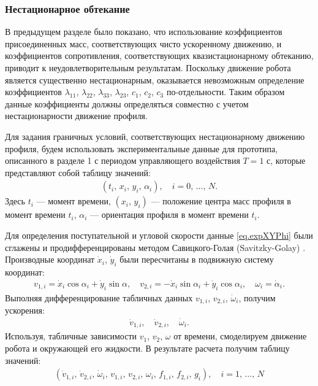 \newpage

\subsubsection*{Нестационарное обтекание}\label{ssec.unsteady}


В предыдущем разделе было показано, что использование коэффициентов присоединенных масс, соответствующих чисто ускоренному движению, и коэффициентов сопротивления, соответствующих квазистационарному обтеканию, приводит к неудовлетворительным результатам. Поскольку движение робота является существенно нестационарным, оказывается невозможным определение коэффициентов $\lambda_{11}$, $\lambda_{22}$, $\lambda_{33}$, $\lambda_{23}$, $c_1$, $c_2$, $c_3$ по-отдельности. Таким образом данные коэффициенты должны определяться совместно с учетом нестационарности движение профиля.

Для задания граничных условий, соответствующих нестационарному движению профиля, будем использовать экспериментальные данные для прототипа, описанного в разделе 1 с периодом управляющего воздействия $T = 1$ с, которые представляют собой таблицу значений:
\begin{gather}
	(t_i,\, x_i,\, y_i,\, \alpha_i),\quad i = 0,\, \ldots,\, N.\label{eq.expXYPhi}
\end{gather}
Здесь $t_i$ --- момент времени, $(x_i,\, y_i)$ --- положение центра масс профиля в момент времени $t_i$, $\alpha_i$ --- ориентация профиля в момент времени $t_i$.

Для определения поступательной и угловой скорости данные \eqref{eq.expXYPhi} были сглажены и продифференцированы методом Савицкого-Голая (Savitzky-Golay) \cite{Gorry_1990, Savitzky_Golay_1964}. Производные координат $\dot{x}_i$, $\dot{y}_i$ были пересчитаны в подвижную систему координат:
\begin{gather}
	v_{1,i} = \dot{x}_i \cos\alpha_i + \dot{y}_i \sin \alpha,\quad v_{2,i} = -\dot{x}_i \sin\alpha_i + \dot{y}_i \cos\alpha_i,\quad \omega_i = \dot{\alpha}_i.
\end{gather}
Выполняя дифференцирование табличных данных $v_{1,i}$, $v_{2,i}$, $\dot{\omega}_i$, получим ускорения:
\begin{gather}
	\dot{v}_{1,i},\quad \dot{v}_{2,i},\quad \dot{\omega}_i.
\end{gather}
Используя, табличные зависимости $v_1$, $v_2$, $\omega$ от времени, смоделируем движение робота и окружающей его жидкости. В результате расчета получим таблицу значений:
\begin{gather}
	(\dot{v}_{1,i},\, \dot{v}_{2,i},\, \dot{\omega}_i,\, v_{1,i},\, v_{2,i},\, \omega_i,\, f_{1,i},\, f_{2,i},\, g_i),\quad i = 1,\, \ldots,\, N
\end{gather}

